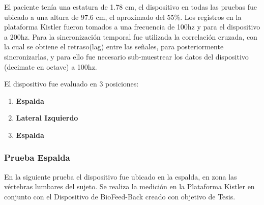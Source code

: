 \documentclass[12pt,a4paper]{article}
\newcommand{\nombreDispositivo}{Dispositivo de BioFeed-Back }
\begin{document}
El paciente tenía una estatura de 1.78 cm, el dispositivo en todas las pruebas fue ubicado a una altura de 97.6 cm, el aproximado del 55\%.
Los registros en la plataforma Kistler fueron tomados a una frecuencia de 100hz y para el dispositivo a 200hz. 
Para la sincronización temporal fue utilizada la correlación cruzada, con la cual se obtiene el retraso(lag) entre las señales, para posteriormente sincronizarlas, y para ello fue necesario sub-muestrear los datos del dispositivo (decimate en octave) a 100hz.

El dispositivo fue evaluado en 3 posiciones:
\begin{enumerate}
	\item \textbf{Espalda} 
	\item \textbf{Lateral Izquierdo}
	\item \textbf{Espalda}
\end{enumerate}

\newpage
\subsubsection{Prueba Espalda} En la siguiente prueba el dispositivo fue ubicado en la espalda, en zona las vértebras lumbares del sujeto. Se realiza la medición en la Plataforma Kistler en conjunto con el \nombreDispositivo creado con objetivo de Tesis.
		
\end{document}
